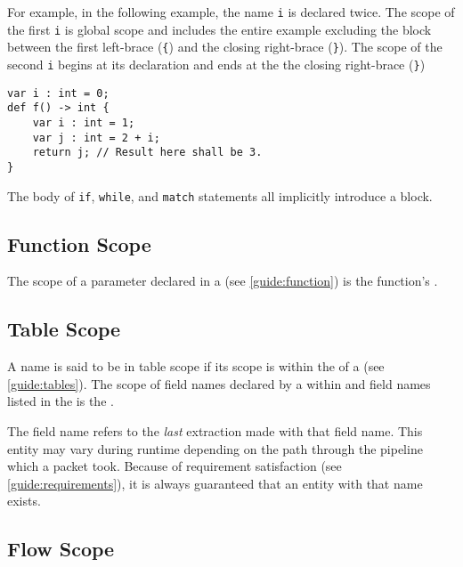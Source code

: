 For example, in the following example, the name \texttt{i} is declared twice. The scope of the first \texttt{i} is global scope and includes the entire example excluding the block between the first left-brace (\texttt{\{}) and the closing right-brace (\texttt{\}}). The scope of the second \texttt{i} begins at its declaration and ends at the the closing right-brace (\texttt{\}})

\begin{minip}
\begin{lstlisting}
var i : int = 0;
def f() -> int {
	var i : int = 1;
	var j : int = 2 + i;
	return j; // Result here shall be 3.
}
\end{lstlisting}
\end{minip}

The body of \texttt{if}, \texttt{while}, and \texttt{match} statements all implicitly introduce a block.

\subsection{Function Scope} \label{guide:function_scope}

The scope of a parameter declared in a  (see \ref{guide:function}) is the function's .

\subsection{Table Scope} \label{guide:table_scope}

A name is said to be in table scope if its scope is within the  of a  (see \ref{guide:tables}). The scope of field names declared by a  within  and field names listed in the  is the .

The field name refers to the \textit{last} extraction made with that field name. This entity may vary during runtime depending on the path through the pipeline which a packet took. Because of requirement satisfaction (see \ref{guide:requirements}), it is always guaranteed that an entity with that name exists.

\subsection{Flow Scope} \label{guide:flow_scope}

